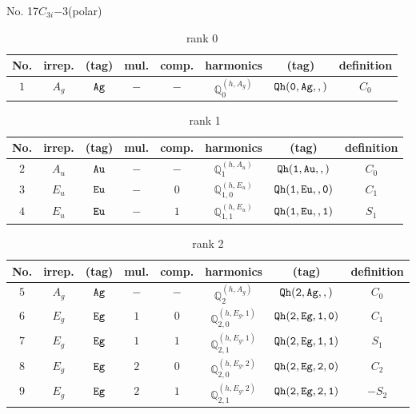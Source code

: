 \documentclass[fleqn,8pt]{jsarticle}
\begin{document}
\setcounter{MaxMatrixCols}{16}

\begin{center}
\LARGE
No. 17\quad$C_{3i}$\quad$-3$\quad[ trigonal ] (polar)
\end{center}
\begin{table}[ht!]
\begin{center}
\caption{rank 0}
\renewcommand{\arraystretch}{1.3}
\begin{tabular}{cccccccc} \hline \hline
No. & irrep. & (tag) & mul. & comp. & harmonics & (tag) & definition \\ \hline
$ 1 $ & $ A_{g} $ & $ {\tt Ag} $ & $ - $ & $ - $ & $ \mathbb{Q}_{0}^{(h,A_{g})} $ & $ {\tt Qh(0,Ag,,)} $ & $ C_{0} $ \\
 \hline \hline
\end{tabular}
\end{center}
\end{table}
\begin{table}[ht!]
\begin{center}
\caption{rank 1}
\renewcommand{\arraystretch}{1.3}
\begin{tabular}{cccccccc} \hline \hline
No. & irrep. & (tag) & mul. & comp. & harmonics & (tag) & definition \\ \hline
$ 2 $ & $ A_{u} $ & $ {\tt Au} $ & $ - $ & $ - $ & $ \mathbb{Q}_{1}^{(h,A_{u})} $ & $ {\tt Qh(1,Au,,)} $ & $ C_{0} $ \\
$ 3 $ & $ E_{u} $ & $ {\tt Eu} $ & $ - $ & $ 0 $ & $ \mathbb{Q}_{1,0}^{(h,E_{u})} $ & $ {\tt Qh(1,Eu,,0)} $ & $ C_{1} $ \\
$ 4 $ & $ E_{u} $ & $ {\tt Eu} $ & $ - $ & $ 1 $ & $ \mathbb{Q}_{1,1}^{(h,E_{u})} $ & $ {\tt Qh(1,Eu,,1)} $ & $ S_{1} $ \\
 \hline \hline
\end{tabular}
\end{center}
\end{table}
\begin{table}[ht!]
\begin{center}
\caption{rank 2}
\renewcommand{\arraystretch}{1.3}
\begin{tabular}{cccccccc} \hline \hline
No. & irrep. & (tag) & mul. & comp. & harmonics & (tag) & definition \\ \hline
$ 5 $ & $ A_{g} $ & $ {\tt Ag} $ & $ - $ & $ - $ & $ \mathbb{Q}_{2}^{(h,A_{g})} $ & $ {\tt Qh(2,Ag,,)} $ & $ C_{0} $ \\
$ 6 $ & $ E_{g} $ & $ {\tt Eg} $ & $ 1 $ & $ 0 $ & $ \mathbb{Q}_{2,0}^{(h,E_{g},1)} $ & $ {\tt Qh(2,Eg,1,0)} $ & $ C_{1} $ \\
$ 7 $ & $ E_{g} $ & $ {\tt Eg} $ & $ 1 $ & $ 1 $ & $ \mathbb{Q}_{2,1}^{(h,E_{g},1)} $ & $ {\tt Qh(2,Eg,1,1)} $ & $ S_{1} $ \\
$ 8 $ & $ E_{g} $ & $ {\tt Eg} $ & $ 2 $ & $ 0 $ & $ \mathbb{Q}_{2,0}^{(h,E_{g},2)} $ & $ {\tt Qh(2,Eg,2,0)} $ & $ C_{2} $ \\
$ 9 $ & $ E_{g} $ & $ {\tt Eg} $ & $ 2 $ & $ 1 $ & $ \mathbb{Q}_{2,1}^{(h,E_{g},2)} $ & $ {\tt Qh(2,Eg,2,1)} $ & $ - S_{2} $ \\
 \hline \hline
\end{tabular}
\end{center}
\end{table}
\end{document}
